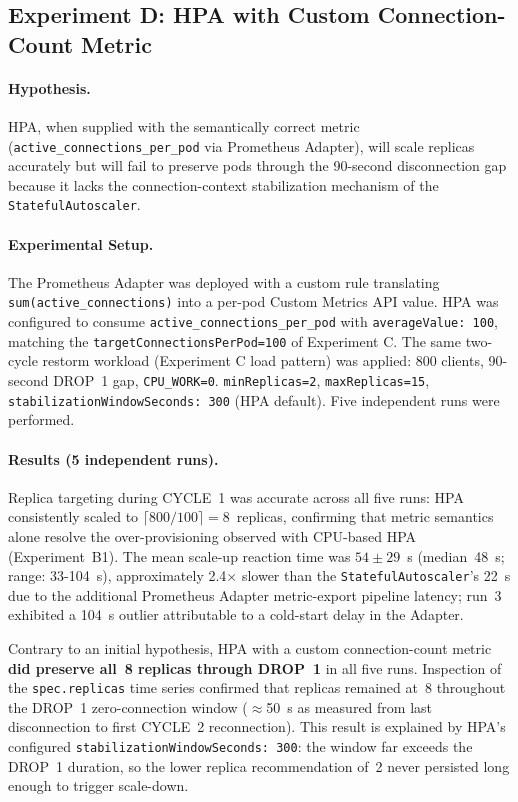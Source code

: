 \documentclass[twocolumn]{svjour3}
\begin{document}
\subsection{Experiment D: HPA with Custom Connection-Count Metric}
\label{sec:experiment_d}

\paragraph{Hypothesis.} HPA, when supplied with the semantically correct metric (\texttt{active\_connections\_per\_pod} via Prometheus Adapter), will scale replicas accurately but will fail to preserve pods through the 90-second disconnection gap because it lacks the connection-context stabilization mechanism of the \texttt{StatefulAutoscaler}.

\paragraph{Experimental Setup.} The Prometheus Adapter was deployed with a custom rule translating \texttt{sum(active\_connections)} into a per-pod Custom Metrics API value. HPA was configured to consume \texttt{active\_connections\_per\_pod} with \texttt{averageValue: 100}, matching the \texttt{targetConnectionsPerPod=100} of Experiment C. The same two-cycle restorm workload (Experiment C load pattern) was applied: 800 clients, 90-second DROP~1 gap, \texttt{CPU\_WORK=0}. \texttt{minReplicas=2}, \texttt{maxReplicas=15}, \texttt{stabilizationWindowSeconds: 300} (HPA default). Five independent runs were performed.

\paragraph{Results (5 independent runs).}
Replica targeting during CYCLE~1 was accurate across all five runs: HPA consistently scaled to $\lceil800/100\rceil = 8$~replicas, confirming that metric semantics alone resolve the over-provisioning observed with CPU-based HPA (Experiment~B1).  The mean scale-up reaction time was $54 \pm 29$~s (median~48~s; range: 33-104~s), approximately 2.4$\times$ slower than the \texttt{StatefulAutoscaler}'s 22~s due to the additional Prometheus Adapter metric-export pipeline latency; run~3 exhibited a 104~s outlier attributable to a cold-start delay in the Adapter.

Contrary to an initial hypothesis, HPA with a custom connection-count metric \textbf{did preserve all~8 replicas through DROP~1} in all five runs.  Inspection of the \texttt{spec.replicas} time series confirmed that replicas remained at~8 throughout the DROP~1 zero-connection window ($\approx$50~s as measured from last disconnection to first CYCLE~2 reconnection).  This result is explained by HPA's configured \texttt{stabilizationWindowSeconds:~300}: the window far exceeds the DROP~1 duration, so the lower replica recommendation of~2 never persisted long enough to trigger scale-down.
\end{document}
